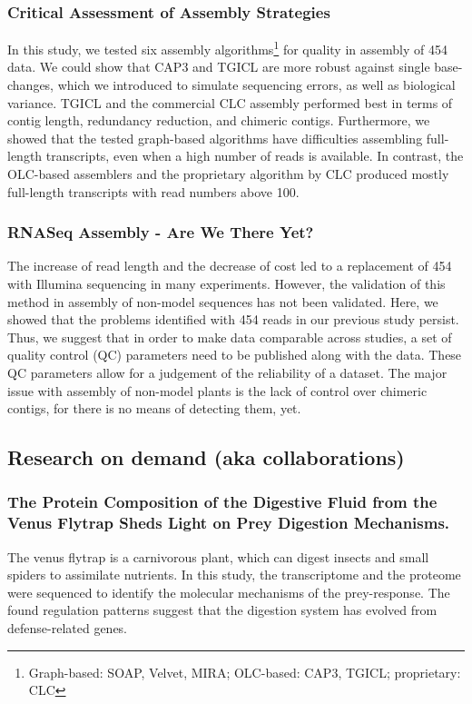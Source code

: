 \subsubsection{Critical Assessment of Assembly Strategies
\cite{mp_Braeutigam2011}}

In this study, we tested six assembly algorithms\footnote{Graph-based: SOAP, Velvet, MIRA; OLC-based: CAP3, TGICL; proprietary: CLC} for quality in  assembly of 454 data. We could show that CAP3 and TGICL are more robust against single base-changes, which we introduced to simulate sequencing errors, as well as biological variance. TGICL and the commercial CLC  assembly performed best in terms of contig length, redundancy reduction, and chimeric contigs.
Furthermore, we showed that the tested graph-based algorithms have difficulties assembling full-length transcripts, even when a high number of reads is available. In contrast, the OLC-based assemblers and the proprietary algorithm by CLC produced mostly full-length transcripts with read numbers above 100.

\subsubsection{RNASeq Assembly - Are We There Yet?
\cite{mp_Schliesky2012}}

The increase of read length and the decrease of cost led to a replacement of 454 with Illumina sequencing in many experiments. However, the validation of this method in  assembly of non-model sequences has not been validated. Here, we showed that the problems identified with 454 reads in our previous study \cite{mp_Braeutigam2011} persist. Thus, we suggest that in order to make data comparable across studies, a set of quality control (QC) parameters need to be published along with the data. These QC parameters allow for a judgement of the reliability of a dataset.
The major issue with  assembly of non-model plants is the lack of control over chimeric contigs, for there is no means of detecting them, yet.

\subsection{Research on demand (aka collaborations)}
\subsubsection{The Protein Composition of the Digestive Fluid
from the Venus Flytrap Sheds Light on Prey
Digestion Mechanisms. \cite{mp_Schulze2012}}
The venus flytrap is a carnivorous plant, which can digest insects and small spiders to assimilate nutrients.
In this study, the transcriptome and the proteome were sequenced to identify the molecular mechanisms of the prey-response.
The found regulation patterns suggest that the digestion system has evolved from defense-related genes.




